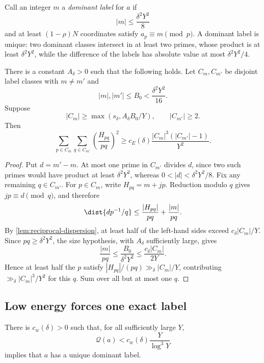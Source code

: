 Call an integer $m$ a \emph{dominant label} for $a$ if
\[
 |m|\leq\frac{\delta^2Y^2}{8}
\]
and at least $(1-\rho)N$ coordinates satisfy $a_p\equiv m\pmod p$.  A dominant label is unique: two dominant classes intersect in at least two primes, whose product is at least $\delta^2Y^2$, while the difference of the labels has absolute value at most $\delta^2Y^2/4$.

\begin{lemma}
\label{lem:cross-label-energy}
There is a constant $A_\delta>0$ such that the following holds.  Let $C_m,C_{m'}$ be disjoint label classes with $m\neq m'$ and
\[
 |m|,|m'|\leq B_0<\frac{\delta^2Y^2}{16}.
\]
Suppose
\[
 |C_m|\geq\max(s_\delta,A_\delta B_0/Y),
 \qquad
 |C_{m'}|\geq2.
\]
Then
\[
 \sum_{p\in C_m}\sum_{q\in C_{m'}}
 \left(\frac{H_{pq}}{pq}\right)^2
 \geq c_E(\delta)\frac{|C_m|^3(|C_{m'}|-1)}{Y^2}.
\]
\end{lemma}

\begin{proof}
Put $d=m'-m$.  At most one prime in $C_{m'}$ divides $d$, since two such primes would have product at least $\delta^2Y^2$, whereas $0<|d|<\delta^2Y^2/8$.  Fix any remaining $q\in C_{m'}$.  For $p\in C_m$, write $H_{pq}=m+jp$.  Reduction modulo $q$ gives $jp\equiv d\pmod q$, and therefore
\[
 \dist{dp^{-1}/q}
 \leq\frac{|H_{pq}|}{pq}+\frac{|m|}{pq}.
\]
By \cref{lem:reciprocal-dispersion}, at least half of the left-hand sides exceed $c_\delta|C_m|/Y$.  Since $pq\geq\delta^2Y^2$, the size hypothesis, with $A_\delta$ sufficiently large, gives
\[
 \frac{|m|}{pq}\leq\frac{B_0}{\delta^2Y^2}
 \leq\frac{c_\delta|C_m|}{2Y}.
\]
Hence at least half the $p$ satisfy $|H_{pq}|/(pq)\gg_\delta |C_m|/Y$, contributing $\gg_\delta |C_m|^3/Y^2$ for this $q$.  Sum over all but at most one $q$.
\end{proof}

\subsection{Low energy forces one exact label}

\begin{proposition}
\label{prop:nondominant-forcing}
There is $c_w(\delta)>0$ such that, for all sufficiently large $Y$,
\[
 \mathcal Q(a)<c_w(\delta)\frac{Y}{\log^3Y}
\]
implies that $a$ has a unique dominant label.
\end{proposition}


